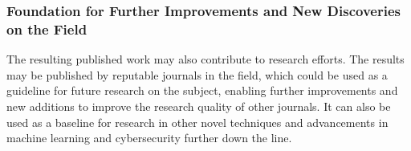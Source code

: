 \documentclass[a4paper, 12pt]{article}
\begin{document}
\subsubsection{ Foundation for Further Improvements and New Discoveries on the Field }

The resulting published work may also contribute to research efforts. The results may be published by reputable journals in the field, which could be used as a guideline for future research on the subject, enabling further improvements and new additions to improve the research quality of other journals. It can also be used as a baseline for research in other novel techniques and advancements in machine learning and cybersecurity further down the line.

\clearpage


{}
\end{document}
